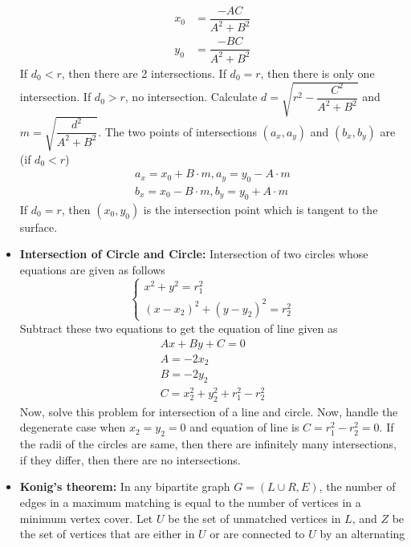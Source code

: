 \documentclass[13pt,a4paper]{article}
\begin{document}
\begin{landscape}
\begin{multicols*}{3}
\begin{itemize}
        \begin{align*}
            x_0 &= \dfrac{-AC}{A^2 + B^2}\\
            y_0 &= \dfrac{-BC}{A^2 + B^2}
        \end{align*}
    If $d_0 < r$, then there are 2 intersections. If $d_0 = r$, then there is only one intersection. If $d_0 > r$, no intersection. Calculate $d = \sqrt{r^2 - \dfrac{C^2}{A^2 + B^2}}$ and $m = \sqrt{\dfrac{d^2}{A^2 + B^2}}$. The two points of intersections $(a_x, a_y)$ and $(b_x, b_y)$ are (if $d_0 < r$)
        \begin{gather*}
            a_x = x_0 + B \cdot m, a_y = y_0 - A  \cdot m\\
            b_x = x_0 - B\cdot m, b_y = y_0 + A\cdot m
        \end{gather*}
    If $d_0 = r$, then $(x_0, y_0)$ is the intersection point which is tangent to the surface.
    \item \textbf{Intersection of Circle and Circle:} Intersection of two circles whose equations are given as follows
        \begin{equation*}
                \begin{cases*}
                    x^2 + y^2 = r_1^2\\
                    (x - x_2)^2 + (y - y_2)^2 = r_2^2
                \end{cases*}
        \end{equation*}
        Subtract these two equations to get the equation of line given as
        \begin{gather*}
            Ax + By + C = 0\\
            A = -2x_2\\
            B = -2y_2\\
            C = x_2^2 + y_2^2 + r_1^2 - r_2^2
        \end{gather*}
    Now, solve this problem for intersection of a line and circle.
    Now, handle the degenerate case when $x_2 = y_2 = 0$ and equation of line is $C = r_1^2 - r_2^2 = 0$. If the radii of the circles are same, then there are infinitely many intersections, if they differ, then there are no intersections.
    \item \textbf{Konig's theorem:} In any bipartite graph $G=(L\cup R,E)$, the number
    of edges in a maximum matching is equal to the number of
    vertices in a minimum vertex cover. Let $U$ be the set of
    unmatched vertices in $L$, and $Z$ be the set of vertices that
    are either in $U$ or are connected to $U$ by an alternating

\end{itemize}
\end{multicols*}
\end{landscape}
\end{document}
